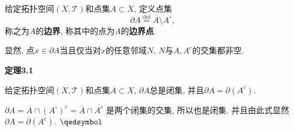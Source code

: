 \documentclass[UTF8]{ctexart}
\begin{document}
给定拓扑空间$(X,\mathcal{T})$和点集$A\subset X$, 定义点集
\[
    \partial A\overset{\mathrm{def}}{=}\overline{A}\setminus A^\circ,
\]
称之为$A$的\textbf{边界}, 称其中的点为$A$的\textbf{边界点}.

显然, 点$x\in\partial A$当且仅当对$x$的任意邻域$N$, $N$与$A,A^c$的交集都非空.

\vspace{10pt}

\hypertarget{sec:定理3.1}{}
\noindent\textbf{定理3.1}

给定拓扑空间$(X,\mathcal{T})$和点集$A\subset X$, $\partial A$总是闭集,
并且$\partial A=\partial(A^c)$.


$\partial A=\overline{A}\cap(A^\circ)^c=\overline{A}\cap\overline{A^c}$
是两个闭集的交集, 所以也是闭集. 并且由此式显然$\partial A=\partial(A^c)$.
\hfill $\qedsymbol$
\end{document}

